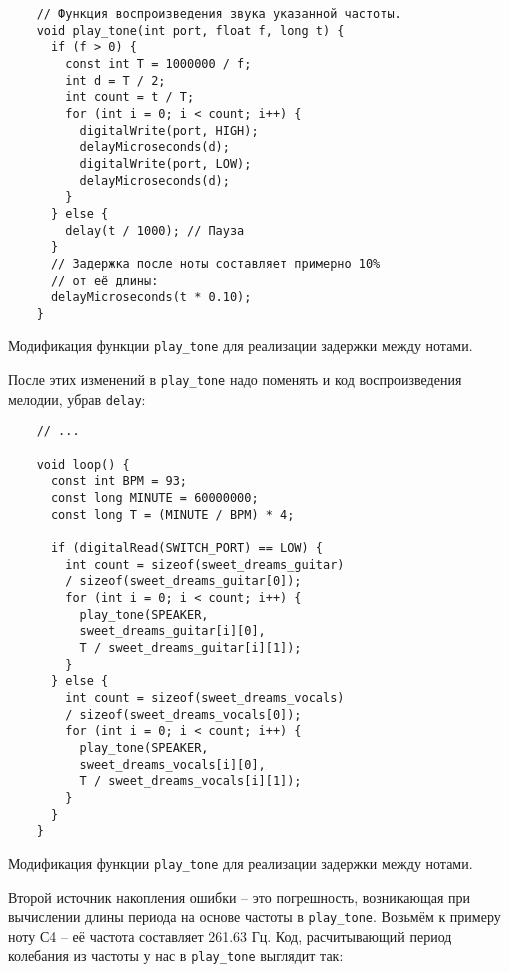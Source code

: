 \documentclass[../sparc.tex]{subfiles}
\begin{document}
\begin{listing}[!h]
  \begin{verbatim}
    // Функция воспроизведения звука указанной частоты.
    void play_tone(int port, float f, long t) {
      if (f > 0) {
        const int T = 1000000 / f;
        int d = T / 2;
        int count = t / T;
        for (int i = 0; i < count; i++) {
          digitalWrite(port, HIGH);
          delayMicroseconds(d);
          digitalWrite(port, LOW);
          delayMicroseconds(d);
        }
      } else {
        delay(t / 1000); // Пауза
      }
      // Задержка после ноты составляет примерно 10%
      // от её длины:
      delayMicroseconds(t * 0.10);
    }
  \end{verbatim}
  \label{listing:music-band-play-tone-with-delay}
  \caption{Модификация функции \texttt{play\_tone} для реализации задержки между
    нотами.}
\end{listing}

После этих изменений в \texttt{play\_tone} надо поменять и код воспроизведения
мелодии, убрав \texttt{delay}:

\begin{listing}[!h]
  \begin{verbatim}
    // ...

    void loop() {
      const int BPM = 93;
      const long MINUTE = 60000000;
      const long T = (MINUTE / BPM) * 4;

      if (digitalRead(SWITCH_PORT) == LOW) {
        int count = sizeof(sweet_dreams_guitar)
        / sizeof(sweet_dreams_guitar[0]);
        for (int i = 0; i < count; i++) {
          play_tone(SPEAKER,
          sweet_dreams_guitar[i][0],
          T / sweet_dreams_guitar[i][1]);
        }
      } else {
        int count = sizeof(sweet_dreams_vocals)
        / sizeof(sweet_dreams_vocals[0]);
        for (int i = 0; i < count; i++) {
          play_tone(SPEAKER,
          sweet_dreams_vocals[i][0],
          T / sweet_dreams_vocals[i][1]);
        }
      }
    }
  \end{verbatim}
  \label{listing:music-band-using-new-play-tone}
  \caption{Модификация функции \texttt{play\_tone} для реализации задержки между
    нотами.}
\end{listing}

Второй источник накопления ошибки -- это погрешность, возникающая при вычислении
длины периода на основе частоты в \texttt{play\_tone}.  Возьмём к примеру ноту
С4 -- её частота составляет 261.63 Гц.  Код, расчитывающий период колебания из
частоты у нас в \texttt{play\_tone} выглядит так:
\end{document}
